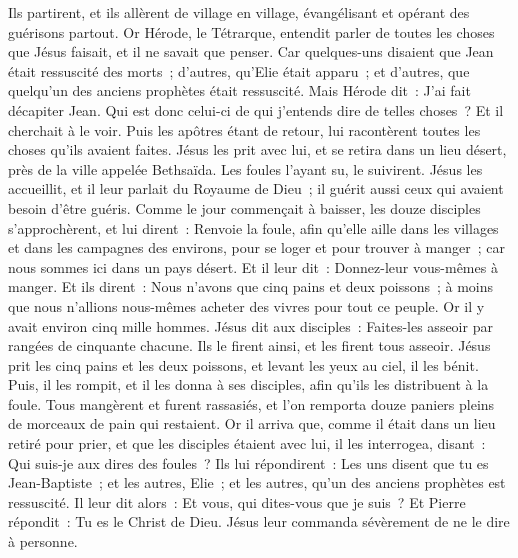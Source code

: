 \begin{multicols}{2}
Ils partirent, et ils allèrent de village en village, évangélisant et opérant des guérisons partout.
Or Hérode, le Tétrarque, entendit parler de toutes les choses que Jésus faisait, et il ne savait que penser. Car quelques-uns disaient que Jean était ressuscité des morts~;
d'autres, qu'Elie était apparu~; et d'autres, que quelqu'un des anciens prophètes était ressuscité.
Mais Hérode dit~: J'ai fait décapiter Jean. Qui est donc celui-ci de qui j'entends dire de telles choses~? Et il cherchait à le voir.
Puis les apôtres étant de retour, lui racontèrent toutes les choses qu'ils avaient faites. Jésus les prit avec lui, et se retira dans un lieu désert, près de la ville appelée Bethsaïda.
Les foules l'ayant su, le suivirent. Jésus les accueillit, et il leur parlait du Royaume de Dieu~; il guérit aussi ceux qui avaient besoin d'être guéris.
Comme le jour commençait à baisser, les douze disciples s'approchèrent, et lui dirent~: Renvoie la foule, afin qu'elle aille dans les villages et dans les campagnes des environs, pour se loger et pour trouver à manger~; car nous sommes ici dans un pays désert.
Et il leur dit~: Donnez-leur vous-mêmes à manger. Et ils dirent~: Nous n'avons que cinq pains et deux poissons~; à moins que nous n'allions nous-mêmes acheter des vivres pour tout ce peuple.
Or il y avait environ cinq mille hommes. Jésus dit aux disciples~: Faites-les asseoir par rangées de cinquante chacune.
Ils le firent ainsi, et les firent tous asseoir.
Jésus prit les cinq pains et les deux poissons, et levant les yeux au ciel, il les bénit. Puis, il les rompit, et il les donna à ses disciples, afin qu'ils les distribuent à la foule.
Tous mangèrent et furent rassasiés, et l'on remporta douze paniers pleins de morceaux de pain qui restaient.
Or il arriva que, comme il était dans un lieu retiré pour prier, et que les disciples étaient avec lui, il les interrogea, disant~: Qui suis-je aux dires des foules~?
Ils lui répondirent~: Les uns disent que tu es Jean-Baptiste~; et les autres, Elie~; et les autres, qu'un des anciens prophètes est ressuscité.
Il leur dit alors~: Et vous, qui dites-vous que je suis~? Et Pierre répondit~: Tu es le Christ de Dieu.
Jésus leur commanda sévèrement de ne le dire à personne.

\end{multicols}
